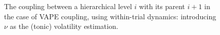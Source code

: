 \begin{figure}
  \centering

  \small

  \newcommand{\w}[1]{\textcolor{white}{#1}}
  \def\svgwidth{0.9\textwidth}


  \caption{The coupling between a hierarchical level $i$ with its parent $i+1$ in the case of \textsf{VAPE} coupling, using within-trial dynamics: introducing $\nu$ as the (tonic) volatility estimation.}
  \label{\figlabel}
\end{figure}

